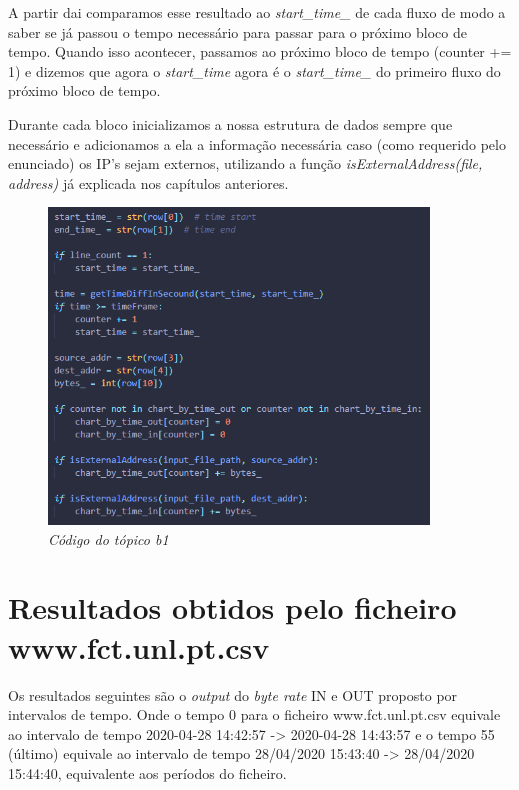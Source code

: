 A partir dai comparamos esse resultado ao \textit{start\_time\_} de cada fluxo de modo a saber se já passou o tempo necessário para passar para o próximo bloco de tempo. Quando isso acontecer, passamos ao próximo bloco de tempo (counter += 1) e dizemos que agora o \textit{start\_time} agora é o \textit{start\_time\_} do primeiro fluxo do próximo bloco de tempo.

Durante cada bloco inicializamos a nossa estrutura de dados sempre que necessário e adicionamos a ela a informação necessária caso (como requerido pelo enunciado) os IP's sejam externos, utilizando a função \textit{isExternalAddress(file, address)} já explicada nos capítulos anteriores.

\begin{figure}[h!]
    \label{high}
    \centering
    \includegraphics[width=0.9\textwidth]{Images/b1/b1.png}
    \caption{\textit{Código do tópico b1}}
\end{figure}

\newpage

\section{Resultados obtidos pelo ficheiro www.fct.unl.pt.csv}

Os resultados seguintes são o \textit{output} do \textit{byte rate} IN e OUT proposto por intervalos de tempo. Onde o tempo 0 para o ficheiro www.fct.unl.pt.csv equivale ao intervalo de tempo 2020-04-28 14:42:57 -> 2020-04-28 14:43:57 e o tempo 55 (último) equivale ao intervalo de tempo 28/04/2020 15:43:40 -> 28/04/2020 15:44:40, equivalente aos períodos do ficheiro.

